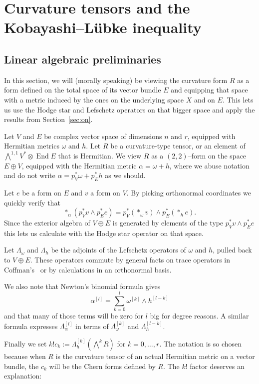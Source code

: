 \documentclass[11pt,a4paper]{amsart}
\def\^#1{^{[#1]}}
\DeclareMathOperator{\End}{End}
\theoremstyle{definition}
\theoremstyle{remark}
\numberwithin{equation}{section}
\begin{document}
\section{Curvature tensors and the Kobayashi--L\"{u}bke inequality}
\label{sec:tw}


\subsection*{Linear algebraic preliminaries}

In this section, we will (morally speaking) be viewing the curvature form
$R$ as a form defined on the total space of its vector bundle $E$ and
equipping that space with a metric induced by the ones on the underlying
space $X$ and on $E$. This lets us use the Hodge star and Lefschetz
operators on that bigger space and apply the results from
Section~\ref{sec:on}.

Let $V$ and $E$ be complex vector space of dimensions $n$ and $r$, equipped
with Hermitian metrics $\omega$ and $h$. Let $R$ be a curvature-type
tensor, or an element of $\bigwedge^{1,1} V^* \otimes \End E$
that is Hermitian. We view $R$ as a $(2,2)$--form on the space $E \oplus
V$, equipped with the Hermitian metric $\alpha = \omega + h$, where we
abuse notation and do not write $\alpha = p_V^*\omega + p_E^*h$ as we should.

Let $e$ be a form on $E$ and $v$ a form on $V$. By picking orthonormal
coordinates we quickly verify that
$$
*_\alpha(p_V^* v \wedge p_E^* e) 
= p_V^*(*_\omega v) \wedge p_E^*(*_h e).
$$
Since the exterior algebra of $V \oplus E$ is generated by elements of the
type $p_V^* v \wedge p_E^* e$ this lets us calculate with the Hodge star
operator on that space.

Let $\Lambda_\omega$ and $\Lambda_h$ be the adjoints of the Lefschetz
operators of $\omega$ and $h$, pulled back to $V \oplus E$. These
operators commute by general facts on trace operators in
Coffman's~\cite{Coffman} or by calculations in an orthonormal basis.

We also note that Newton's binomial formula gives
$$
\alpha\^{l} = \sum_{k=0}^{l} \omega\^{k} \wedge h\^{l-k}
$$
and that many of those terms will be zero for $l$ big for degree
reasons. A similar formula expresses $\Lambda\^{l}_\alpha$ in terms of
$\Lambda\^{k}_\omega$ and $\Lambda\^{l-k}_h$.

Finally we set $k! c_k := \Lambda\^{k}_h (\bigwedge^k \! R)$ for $k = 0, \ldots,
r$.  The notation is so chosen because when $R$ is the curvature tensor of
an actual Hermitian metric on a vector bundle, the $c_k$ will be the Chern
forms defined by $R$. The $k!$ factor deserves an explanation:
\end{document}
